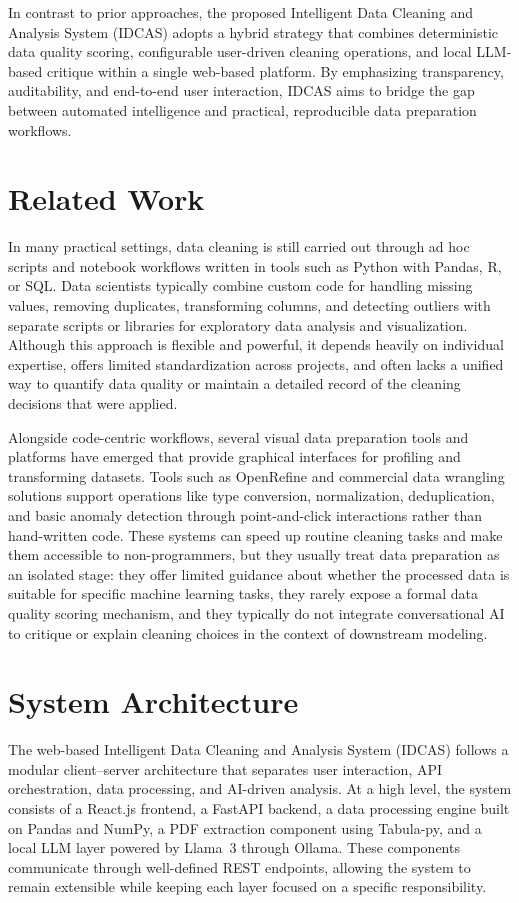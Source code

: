 \documentclass[conference]{IEEEtran}
\begin{document}
In contrast to prior approaches, the proposed Intelligent Data Cleaning and Analysis System (IDCAS) adopts a hybrid strategy that combines deterministic data quality scoring, configurable user-driven cleaning operations, and local LLM-based critique within a single web-based platform. By emphasizing transparency, auditability, and end-to-end user interaction, IDCAS aims to bridge the gap between automated intelligence and practical, reproducible data preparation workflows.

\section{Related Work}

In many practical settings, data cleaning is still carried out through ad hoc scripts and notebook workflows written in tools such as Python with Pandas, R, or SQL. Data scientists typically combine custom code for handling missing values, removing duplicates, transforming columns, and detecting outliers with separate scripts or libraries for exploratory data analysis and visualization. Although this approach is flexible and powerful, it depends heavily on individual expertise, offers limited standardization across projects, and often lacks a unified way to quantify data quality or maintain a detailed record of the cleaning decisions that were applied.

Alongside code-centric workflows, several visual data preparation tools and platforms have emerged that provide graphical interfaces for profiling and transforming datasets. Tools such as OpenRefine and commercial data wrangling solutions support operations like type conversion, normalization, deduplication, and basic anomaly detection through point-and-click interactions rather than hand-written code. These systems can speed up routine cleaning tasks and make them accessible to non-programmers, but they usually treat data preparation as an isolated stage: they offer limited guidance about whether the processed data is suitable for specific machine learning tasks, they rarely expose a formal data quality scoring mechanism, and they typically do not integrate conversational AI to critique or explain cleaning choices in the context of downstream modeling.
\section{System Architecture}

The web-based Intelligent Data Cleaning and Analysis System (IDCAS) follows a modular client--server architecture that separates user interaction, API orchestration, data processing, and AI-driven analysis. At a high level, the system consists of a React.js frontend, a FastAPI backend, a data processing engine built on Pandas and NumPy, a PDF extraction component using Tabula-py, and a local LLM layer powered by Llama~3 through Ollama. These components communicate through well-defined REST endpoints, allowing the system to remain extensible while keeping each layer focused on a specific responsibility.
\end{document}
